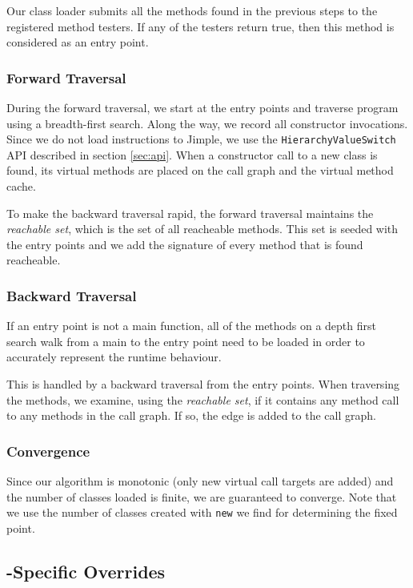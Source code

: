 \documentclass{sigplanconf}
\begin{document}
Our class loader submits all the methods found in the previous steps to the registered method testers. If any of the testers return true, then this method is considered as an entry point.

\subsubsection{Forward Traversal}

During the forward traversal, we start at the entry points and traverse program using a breadth-first search. Along the way, we record all constructor invocations. Since we do not load instructions to Jimple, we use the {\tt HierarchyValueSwitch} API described in section \ref{sec:api}.
When a constructor call to a new class is found, its virtual methods are placed on the call graph and the virtual method cache.

To make the backward traversal rapid, the forward traversal maintains the \emph{reachable set}, which is the set of all reacheable methods. This set is seeded with the entry points and we add the signature of every method that is found reacheable.


\subsubsection{Backward Traversal}
If an entry point is not a main function, all of the methods on a depth first search walk from a main to the entry point need to be loaded in order to accurately represent the runtime behaviour.

This is handled by a backward traversal from the entry points. When traversing the methods, we examine, using the \emph{reachable set}, if it contains any method call to any methods in the call graph. If so, the edge is added to the call graph.

\subsubsection{Convergence}

Since our algorithm is monotonic (only new virtual call targets are added) and the number of classes loaded is finite, we are guaranteed to converge. Note that we use the number of classes created with {\tt new} we find for determining the fixed point.

\subsection{\rb{}-Specific Overrides}
\label{sec:followtosig}
\end{document}
